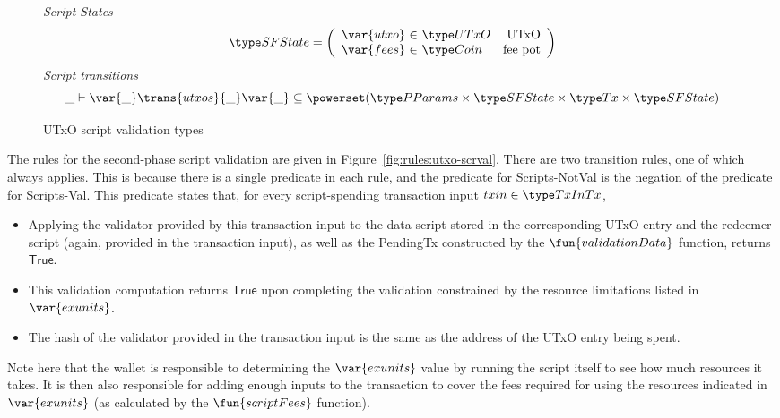 \begin{figure}[htb]
  \emph{Script States}
  \begin{equation*}
    \SFState =
    \left(
      \begin{array}{r@{~\in~}lr}
        \var{utxo} & \UTxO & \text{UTxO}\\
        \var{fees} & \Coin & \text{fee pot}\\
      \end{array}
    \right)
  \end{equation*}
  \emph{Script transitions}
  \begin{equation*}
    \_ \vdash
    \var{\_} \trans{utxos}{\_} \var{\_}
    \subseteq \powerset (\PParams \times \SFState \times \Tx \times \SFState)
  \end{equation*}
  \caption{UTxO script validation types}
  \label{fig:ts-types:utxo-scripts}
\end{figure}

The rules for the second-phase script validation are given in
Figure~\ref{fig:rules:utxo-scrval}. There are two transition rules, one of
which always applies. This is because there is a single predicate in each rule, and
the predicate for Scripts-NotVal is the negation of the predicate for
Scripts-Val. This predicate states that, for every script-spending
transaction input $txin \in \TxInTx$,

\begin{itemize}
\item Applying the validator provided by this transaction input
to the data script stored in the corresponding UTxO entry and the redeemer
script (again, provided in the transaction input), as well as the PendingTx
constructed by the $\fun{validationData}$ function, returns $\mathsf{True}$.
\item This validation computation returns $\mathsf{True}$ upon completing
the validation constrained by the resource limitations listed in $\var{exunits}$.
\item The hash of the validator provided in the transaction input is
the same as the address of the UTxO entry being spent.
\end{itemize}

Note here that the wallet is responsible to determining the $\var{exunits}$ value
by running the script itself to see how much resources it takes. It is then
also responsible for adding enough inputs to the transaction to cover the
fees required for using the resources indicated in $\var{exunits}$ (as
calculated by the $\fun{scriptFees}$ function).

